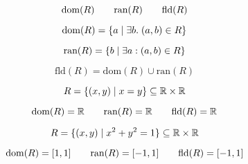 
\begin{frame}{}
  \begin{center}
    \[
      \text{dom}(R) \qquad \text{ran}(R) \qquad \text{fld}(R)
    \]
  \end{center}
\end{frame}

\begin{frame}{}
  \begin{definition}
    \[
      \text{dom}(R) = \{a \mid \exists b.\; (a,b) \in R\}
    \]
  \end{definition}

  \pause
  \vspace{0.80cm}
  \begin{definition}[值域 (Range)]
    \[
      \text{ran}(R) = \{b \mid \exists a: (a,b) \in R\}
    \]
  \end{definition}

  \pause
  \vspace{0.80cm}
  \begin{definition}[域 (Field)]
    \[
      \text{fld}(R) = \text{dom}(R) \cup \text{ran}(R)
    \]
  \end{definition}
\end{frame}

\begin{frame}{}
  \[
    R = \{(x, y) \mid x = y\} \subseteq \mathbb{R} \times \mathbb{R}
  \]

  \pause
  \[
    \text{dom}(R) = \mathbb{R} \qquad \text{ran}(R) = \mathbb{R} \qquad \text{fld}(R) = \mathbb{R}
  \]
\end{frame}

\begin{frame}{}
  \[
    R = \{(x, y) \mid x^2 + y^2 = 1\} \subseteq \mathbb{R} \times \mathbb{R}
  \]

  \pause
  \[
    \text{dom}(R) = [1, 1] \qquad \text{ran}(R) = [-1, 1] \qquad \text{fld}(R) = [-1, 1]
  \]
\end{frame}

